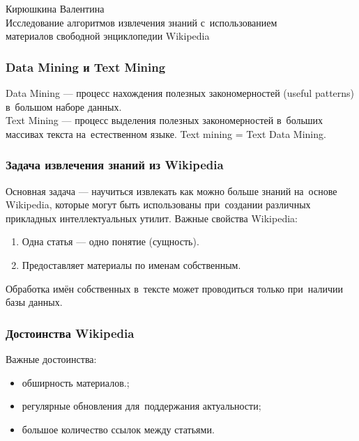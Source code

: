 \documentclass{beamer}
\begin{document}
\begin{frame}
\begin{center}
Кирюшкина Валентина \\
\vspace{1cm}
{\Large Исследование алгоритмов извлечения знаний с~использованием\\ 
материалов свободной энциклопедии Wikipedia}\\ 
\end{center}
\end{frame}

\begin{frame}
\frametitle{Data Mining и Text Mining}
Data Mining --- процесс нахождения полезных закономерностей (useful patterns)  в~большом наборе данных.\\
\vspace{1cm}
Text Mining --- процесс выделения полезных закономерностей 
в~больших массивах текста на~естественном языке. 
Text mining = Text Data Mining.
\end{frame}

\begin{frame}
\frametitle{Задача извлечения знаний из Wikipedia}

Основная задача --- научиться извлекать как можно больше знаний на~основе Wikipedia,
которые могут быть использованы  при~создании различных прикладных интеллектуальных утилит.
Важные свойства Wikipedia:

\begin{enumerate}

\item {Одна статья --- одно понятие (сущность).}
\item{Предоставляет материалы по именам собственным.}

\end{enumerate}

Обработка имён собственных в~тексте может проводиться только при~наличии базы данных.

\end{frame}

\begin{frame}
\frametitle{Достоинства Wikipedia}

Важные достоинства:

\begin{itemize}
\item{обширность материалов.;}
\item{регулярные обновления для~поддержания актуальности;}
\item{большое количество ссылок между статьями.}
\end{itemize}

\end{frame}
\end{document}
